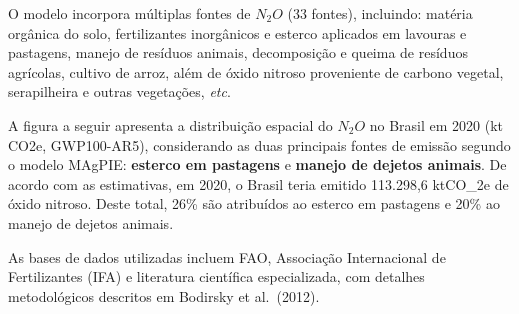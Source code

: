 \documentclass[
]{article}
\begin{document}
O modelo incorpora múltiplas fontes de \(N_2O\) (33 fontes), incluindo:
matéria orgânica do solo, fertilizantes inorgânicos e esterco aplicados
em lavouras e pastagens, manejo de resíduos animais, decomposição e
queima de resíduos agrícolas, cultivo de arroz, além de óxido nitroso
proveniente de carbono vegetal, serapilheira e outras vegetações,
\emph{etc}.

A figura a seguir apresenta a distribuição espacial do \(N_2O\) no
Brasil em 2020 (kt CO2e, GWP100-AR5), considerando as duas principais
fontes de emissão segundo o modelo MAgPIE: \textbf{esterco em pastagens}
e \textbf{manejo de dejetos animais}. De acordo com as estimativas, em
2020, o Brasil teria emitido 113.298,6 ktCO\_2e de óxido nitroso. Deste
total, 26\% são atribuídos ao esterco em pastagens e 20\% ao manejo de
dejetos animais.

As bases de dados utilizadas incluem FAO, Associação Internacional de
Fertilizantes (IFA) e literatura científica especializada, com detalhes
metodológicos descritos em Bodirsky et al.~(2012).
\end{document}
